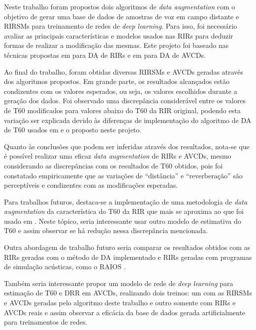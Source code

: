 Neste trabalho foram propostos dois algoritmos de \textit{data augmentation} com o objetivo de gerar uma base de dados de amostras de voz 
em campo distante e RIRSMs para treinamento de redes de \textit{deep learning}.
Para isso, foi necessário avaliar as principais características e modelos usados nas RIRs para deduzir formas de realizar
a modificação das mesmas. Este projeto foi baseado nas técnicas propostas em \cite{RIR_Data_Aug} para DA de RIRs e em \cite{Speech_Rec}
para DA de AVCDs.

Ao final do trabalho, foram obtidas diversas RIRSMs e AVCDs geradas através dos algoritmos propostos. 
Em grande parte, os resultados alcançados estão condizentes com os valores esperados, ou seja, os valores
escolhidos durante a geração dos dados. Foi observado uma discrepância considerável entre os valores de T60 modificados 
para valores abaixo do T60 da RIR original, podendo esta variação ser explicada devido às diferenças de implementação 
do algoritmo de DA de T60 usados em \cite{RIR_Data_Aug} e o proposto neste projeto.

Quanto às conclusões que podem ser inferidas através dos resultados, nota-se que é possível realizar uma eficaz
\textit{data augmentation} de RIRs e AVCDs, mesmo considerando as discrepâncias com os resultados de T60 obtidos,
pois foi constatado empiricamente que as variações de “distância” e “reverberação” são perceptíveis e condizentes com as modificações
esperadas.

Para trabalhos futuros, destaca-se a implementação de uma metodologia de \textit{data augmentation} da característica do T60
da RIR que mais se aproxima ao que foi usado em \cite{RIR_Data_Aug}. Neste tópico, seria interessante usar outro modelo
de estimativa do T60 e assim observar se há redução nessa discrepância mencionada.

Outra abordagem de trabalho futuro seria comparar os resultados obtidos com as RIRs geradas com o método de DA implementado e RIRs 
geradas com programas de simulação acústicas, como o RAIOS \cite{RAIOS}.

Também seria interessante propor um modelo de rede de \textit{deep learning} para estimação de T60 e DRR em AVCDs,
realizando dois treinos: um com as RIRSMs e AVCDs geradas pelo algoritmo deste trabalho e outro somente com RIRs e AVCDs reais e 
assim observar a eficácia da base de dados gerada artificialmente para treinamentos de redes.







